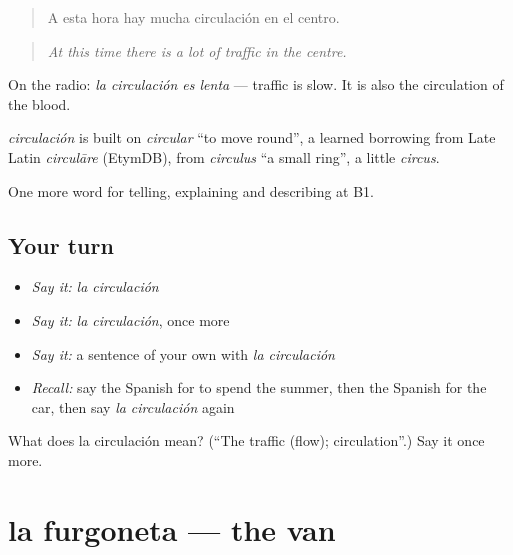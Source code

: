 \begin{quote}
A esta hora hay mucha circulación en el centro.
\end{quote}

\begin{quote}
\emph{At this time there is a lot of traffic in the centre.}
\end{quote}

On the radio: \emph{la circulación es lenta} — traffic is slow. It is also the circulation of the blood.

\begin{cousinweb}
\emph{circulación} is built on \emph{circular} \textquotedblleft{}to move round\textquotedblright{}, a learned borrowing from Late Latin \emph{circulāre} (EtymDB), from \emph{circulus} \textquotedblleft{}a small ring\textquotedblright{}, a little \emph{circus}.
\end{cousinweb}

\begin{grammarlens}[title={What you've built}]
One more word for telling, explaining and describing at B1.
\end{grammarlens}

\subsection*{Your turn}
\begin{itemize}
\raggedright
  \item \emph{Say it:} \emph{la circulación}
  \item \emph{Say it:} \emph{la circulación}, once more
  \item \emph{Say it:} a sentence of your own with \emph{la circulación}
  \item \emph{Recall:} say the Spanish for to spend the summer, then the Spanish for the car, then say \emph{la circulación} again
\end{itemize}

\begin{tcolorbox}[breakable,colback=teal!4,colframe=teal!35!black,title={Before you move on}]
What does la circulación mean? (\textquotedblleft{}The traffic (flow); circulation\textquotedblright{}.) Say it once more.
\end{tcolorbox}
\section[la furgoneta]{la furgoneta — the van}

\label{lesson:ES-C640-furgoneta}



